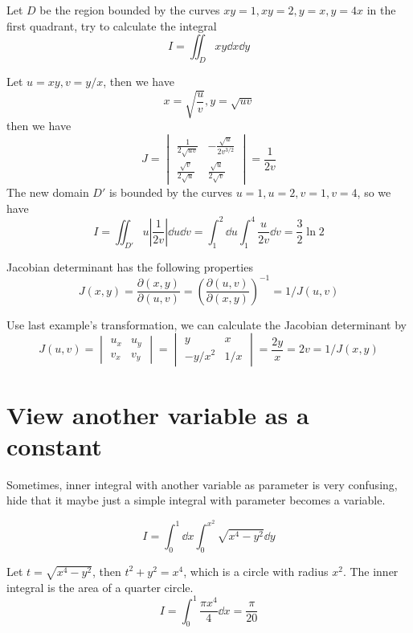 \documentclass[a4]{overview}
\begin{document}
\begin{example}
	Let $D$ be the region bounded by the curves $xy=1, xy=2, y=x, y=4x$ in the first
	quadrant, try to calculate the integral
	\[
	I = \iint_D xy \dd x \dd y
	\] 
	\begin{answer}
		Let $u=xy, v=y/x$, then we have
		\[
			x = \sqrt{\frac{u}{v}}, y = \sqrt{uv}
		\] 
		then we have
		\[
			J = 		\begin{vmatrix}
				\frac{1}{2\sqrt{uv}} & -\frac{\sqrt{u}}{2v^{3/2}} \\
				\frac{\sqrt{v}}{2\sqrt{u}} & \frac{\sqrt{u}}{2\sqrt{v}}
			\end{vmatrix} = \frac{1}{2v}
		\] 
		The new domain $D'$ is bounded by the curves $u=1, u=2, v=1, v=4$, so we have
		\[
			I = \iint_{D'} u \left| \frac{1}{2v} \right| \dd u \dd v
			= \int_1^2 \dd u \int_1^4 \frac{u}{2v} \dd v
			= \frac{3}{2} \ln 2
		\]
		
	\end{answer}
	
\end{example}

\begin{lemma}
	Jacobian determinant has the following properties
	\[
		J(x, y) =	\frac{\partial(x, y)}{\partial(u, v)} =
		\left( \frac{\partial(u, v)}{\partial(x, y)}\right)^{-1} = 1 / J(u, v)
	\] 
\end{lemma}

\begin{example}
	Use last example's transformation, we can calculate the Jacobian determinant by
	\[
		J(u, v) = \begin{vmatrix}
			u_x & u_y \\
			v_x & v_y
		\end{vmatrix} = \begin{vmatrix}
			y & x \\
			-y/x^2 & 1/x
		\end{vmatrix} = \frac{2y}{x} = 2v = 1 / J(x, y)
	\] 
\end{example}

\section{View another variable as a constant}

Sometimes, inner integral with another variable as parameter is very confusing,
hide that it maybe just a simple integral with parameter becomes a variable.

\begin{example}
	\[
		I = \int_0^1 \dd x \int_0^{x^2} \sqrt{x^{4} - y^2} \dd y
	\] 
	\begin{answer}
		Let $t=\sqrt{x^4 - y^2}$, then $t^2 + y^2 = x^4$, which is a circle with radius $x^2$.
		The inner integral is the area of a quarter circle.
		\[
			I = \int_0^1 \frac{\pi x^4}{4} \dd x
			= \frac{\pi}{20}
		\] 
	\end{answer}
\end{example}
\end{document}
